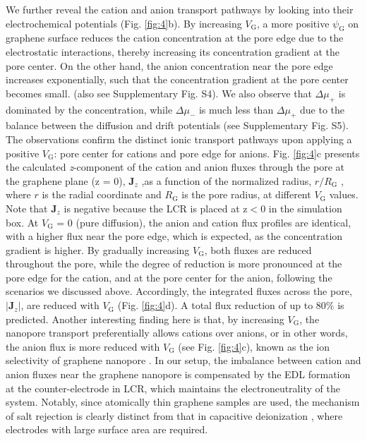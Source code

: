 \documentclass[journal=langd5,email=true, hyperref=true, keywords=false]{achemso}
\newcommand{\Fig}{Fig.}
\begin{document}
We further reveal the cation and anion transport pathways by looking
into their electrochemical potentials (\Fig{} \ref{fig:4}b). By
increasing $V_{\mathrm{G}}$, a more positive $\psi_{\mathrm{G}}$ on
graphene surface reduces the cation concentration at the pore edge due
to the electrostatic interactions, thereby increasing its
concentration gradient at the pore center. On the other hand, the
anion concentration near the pore edge increases exponentially, such
that the concentration gradient at the pore center becomes
small. (also see Supplementary \Fig{} S4). We also observe that
$\Delta \mu_{+}$ is dominated by the concentration, while
$\Delta \mu_{-}$ is much less than $\Delta \mu_{+}$ due to the balance
between the diffusion and drift potentials (see Supplementary \Fig{}
S5). The observations confirm the distinct ionic transport pathways
upon applying a positive $V_{\mathrm{G}}$: pore center for cations and
pore edge for anions. \Fig{} \ref{fig:4}c presents the calculated
\textit{z}-component of the cation and anion fluxes through the pore
at the graphene plane (z = 0), $\boldsymbol{J}_{z}$ ,as a function of
the normalized radius, $r/R_{\mathrm{G}}$ , where $r$ is the radial
coordinate and $R_{\mathrm{G}}$ is the pore radius, at different
$V_{\mathrm{G}}$ values. Note that $\boldsymbol{J}_{z}$ is negative
because the LCR is placed at z$<$0 in the simulation box. At
$V_{\mathrm{G}}$ = 0 (pure diffusion), the anion and cation flux
profiles are identical, with a higher flux near the pore edge, which
is expected, as the concentration gradient is higher. By gradually
increasing $V_{\mathrm{G}}$, both fluxes are reduced throughout the
pore, while the degree of reduction is more pronounced at the pore
edge for the cation, and at the pore center for the anion, following
the scenarios we discussed above. Accordingly, the integrated fluxes
across the pore, $|\boldsymbol{J}_{z}|$, are reduced with
$V_{\mathrm{G}}$ (\Fig{} \ref{fig:4}d). A total flux reduction of up
to 80\% is predicted. Another interesting finding here is that, by
increasing $V_{\mathrm{G}}$, the nanopore transport preferentially
allows cations over anions, or in other words, the anion flux is more
reduced with $V_{\mathrm{G}}$ (see \Fig{} \ref{fig:4}c), known as the
ion selectivity of graphene nanopore \cite{Rollings_2016}. In our setup, the imbalance between cation and anion
fluxes near the graphene nanopore is compensated by the EDL formation
at the counter-electrode in LCR, which maintains the electroneutrality
of the system. Notably, since atomically thin graphene samples are
used, the mechanism of salt rejection is clearly distinct from that in
capacitive deionization \cite{Li_2010}, where electrodes with large
surface area are required.
\end{document}
